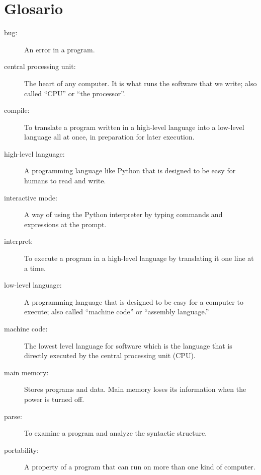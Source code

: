 \section{Glosario}

\begin{description}

\item[bug:]  An error in a program.

\item[central processing unit:] The heart of any computer.  It is what
runs the software that we write; also called ``CPU'' or ``the processor''.

\item[compile:]  To translate a program written in a high-level language
into a low-level language all at once, in preparation for later
execution.

\item[high-level language:]  A programming language like Python that
is designed to be easy for humans to read and write.

\item[interactive mode:] A way of using the Python interpreter by
typing commands and expressions at the prompt.

\item[interpret:]  To execute a program in a high-level language
by translating it one line at a time.

\item[low-level language:]  A programming language that is designed
to be easy for a computer to execute; also called ``machine code'' or
``assembly language.''

\item[machine code:]  The lowest level language for software which 
is the language that is directly executed by the central processing unit 
(CPU).

\item[main memory:] Stores programs and data.  Main memory loses 
its information when the power is turned off.

\item[parse:]  To examine a program and analyze the syntactic structure.

\item[portability:]  A property of a program that can run on more
than one kind of computer.


\end{description}
